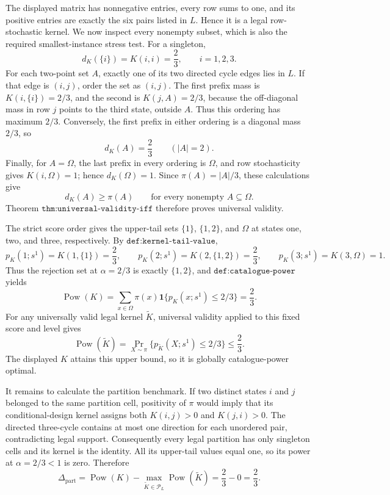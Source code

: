 The displayed matrix has nonnegative entries, every row sums to one, and its positive entries are exactly the six pairs listed in \(L\).  Hence it is a legal row-stochastic kernel.  We now inspect every nonempty subset, which is also the required smallest-instance stress test.  For a singleton,
\[
 d_K(\{i\})=K(i,i)=\frac23,\qquad i=1,2,3.
\]
For each two-point set \(A\), exactly one of its two directed cycle edges lies in \(L\).  If that edge is \((i,j)\), order the set as \((i,j)\).  The first prefix mass is \(K(i,\{i\})=2/3\), and the second is \(K(j,A)=2/3\), because the off-diagonal mass in row \(j\) points to the third state, outside \(A\).  Thus this ordering has maximum \(2/3\).  Conversely, the first prefix in either ordering is a diagonal mass \(2/3\), so
\[
 d_K(A)=\frac23\qquad (|A|=2).
\]
Finally, for \(A=\Omega\), the last prefix in every ordering is \(\Omega\), and row stochasticity gives \(K(i,\Omega)=1\); hence \(d_K(\Omega)=1\).  Since \(\pi(A)=|A|/3\), these calculations give
\[
 d_K(A)\geq \pi(A)\qquad\text{for every nonempty }A\subseteq\Omega.
\]
Theorem \(\texttt{thm:universal-validity-iff}\) therefore proves universal validity.

The strict score order gives the upper-tail sets \(\{1\}\), \(\{1,2\}\), and \(\Omega\) at states one, two, and three, respectively.  By \(\texttt{def:kernel-tail-value}\),
\[
 p_K(1;s^1)=K(1,\{1\})=\frac23,
 \qquad
 p_K(2;s^1)=K(2,\{1,2\})=\frac23,
 \qquad
 p_K(3;s^1)=K(3,\Omega)=1.
\]
Thus the rejection set at \(\alpha=2/3\) is exactly \(\{1,2\}\), and \(\texttt{def:catalogue-power}\) yields
\[
 \operatorname{Pow}(K)=\sum_{x\in\Omega}\pi(x)\mathbf 1\{p_K(x;s^1)\leq2/3\}=\frac23.
\]
For any universally valid legal kernel \(\widetilde K\), universal validity applied to this fixed score and level gives
\[
 \operatorname{Pow}(\widetilde K)
 =\Pr_{X\sim\pi}\{p_{\widetilde K}(X;s^1)\leq2/3\}
 \leq\frac23.
\]
The displayed \(K\) attains this upper bound, so it is globally catalogue-power optimal.

It remains to calculate the partition benchmark.  If two distinct states \(i\) and \(j\) belonged to the same partition cell, positivity of \(\pi\) would imply that its conditional-design kernel assigns both \(K(i,j)>0\) and \(K(j,i)>0\).  The directed three-cycle contains at most one direction for each unordered pair, contradicting legal support.  Consequently every legal partition has only singleton cells and its kernel is the identity.  All its upper-tail values equal one, so its power at \(\alpha=2/3<1\) is zero.  Therefore
\[
 \Delta_{\mathrm{part}}
 =\operatorname{Pow}(K)-\max_{\widetilde K\in\mathcal P_L}\operatorname{Pow}(\widetilde K)
 =\frac23-0=\frac23.
\]

